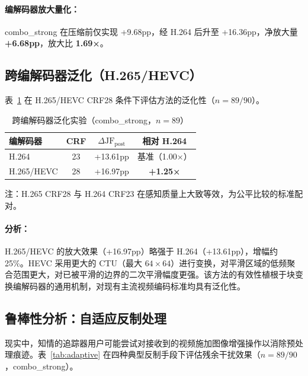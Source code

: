 \documentclass[UTF8,a4paper,12pt]{ctexart}
\begin{document}
\paragraph{编解码器放大量化：}combo\_strong 在压缩前仅实现 +9.68pp，经 H.264 后升至 +16.36pp，净放大量 \textbf{+6.68pp}，放大比 \textbf{1.69×}。

\subsection{跨编解码器泛化（H.265/HEVC）}

表~\ref{tab:hevc} 在 H.265/HEVC CRF28 条件下评估方法的泛化性（$n=89/90$）。

\begin{table}[H]
\centering
\caption{跨编解码器泛化实验（combo\_strong，$n=89$）}
\label{tab:hevc}
\begin{tabular}{lccc}
\toprule
编解码器 & CRF & $\Delta\text{JF}_{\text{post}}$ & 相对 H.264 \\
\midrule
H.264 & 23 & +13.61pp & 基准（1.00×） \\
H.265/HEVC & 28 & +16.97pp & \textbf{+1.25×} \\
\bottomrule
\end{tabular}
\smallskip

\small 注：H.265 CRF28 与 H.264 CRF23 在感知质量上大致等效，为公平比较的标准配对。
\end{table}

\paragraph{分析：}H.265/HEVC 的放大效果（+16.97pp）略强于 H.264（+13.61pp），增幅约 25\%。HEVC 采用更大的 CTU（最大 $64\times 64$）进行变换，对平滑区域的低频聚合范围更大，对已被平滑的边界的二次平滑幅度更强。该方法的有效性植根于块变换编解码器的通用机制，对现有主流视频编码标准均具有泛化性。

\subsection{鲁棒性分析：自适应反制处理}

现实中，知情的追踪器用户可能尝试对接收到的视频施加图像增强操作以消除预处理痕迹。表~\ref{tab:adaptive} 在四种典型反制手段下评估残余干扰效果（$n=89/90$，combo\_strong）。
\end{document}
